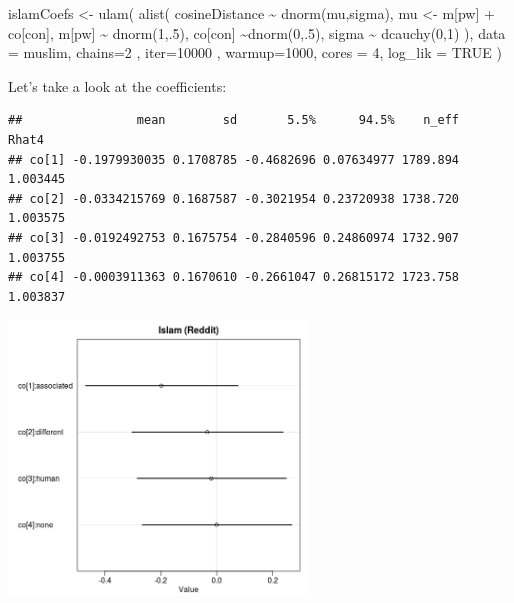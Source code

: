 \documentclass[
  12pt,
]{book}
\newenvironment{Shaded}{\begin{snugshade}}{\end{snugshade}}
\newcommand{\AttributeTok}[1]{\textcolor[rgb]{0.77,0.63,0.00}{#1}}
\newcommand{\ConstantTok}[1]{\textcolor[rgb]{0.00,0.00,0.00}{#1}}
\newcommand{\DecValTok}[1]{\textcolor[rgb]{0.00,0.00,0.81}{#1}}
\newcommand{\FunctionTok}[1]{\textcolor[rgb]{0.00,0.00,0.00}{#1}}
\newcommand{\NormalTok}[1]{#1}
\newcommand{\OtherTok}[1]{\textcolor[rgb]{0.56,0.35,0.01}{#1}}
\newcommand{\SpecialCharTok}[1]{\textcolor[rgb]{0.00,0.00,0.00}{#1}}
\begin{document}
\begin{Shaded}
\begin{Highlighting}[]
\NormalTok{islamCoefs }\OtherTok{\textless{}{-}} \FunctionTok{ulam}\NormalTok{(}
  \FunctionTok{alist}\NormalTok{(}
\NormalTok{    cosineDistance }\SpecialCharTok{\textasciitilde{}} \FunctionTok{dnorm}\NormalTok{(mu,sigma),}
\NormalTok{    mu }\OtherTok{\textless{}{-}}\NormalTok{ m[pw] }\SpecialCharTok{+}\NormalTok{ co[con],}
\NormalTok{    m[pw] }\SpecialCharTok{\textasciitilde{}} \FunctionTok{dnorm}\NormalTok{(}\DecValTok{1}\NormalTok{,.}\DecValTok{5}\NormalTok{),}
\NormalTok{    co[con] }\SpecialCharTok{\textasciitilde{}}\FunctionTok{dnorm}\NormalTok{(}\DecValTok{0}\NormalTok{,.}\DecValTok{5}\NormalTok{),}
\NormalTok{    sigma }\SpecialCharTok{\textasciitilde{}} \FunctionTok{dcauchy}\NormalTok{(}\DecValTok{0}\NormalTok{,}\DecValTok{1}\NormalTok{)}
\NormalTok{  ),}
  \AttributeTok{data =}\NormalTok{ muslim,}
  \AttributeTok{chains=}\DecValTok{2}\NormalTok{ , }\AttributeTok{iter=}\DecValTok{10000}\NormalTok{ , }\AttributeTok{warmup=}\DecValTok{1000}\NormalTok{, }\AttributeTok{cores =} \DecValTok{4}\NormalTok{,}
  \AttributeTok{log\_lik =} \ConstantTok{TRUE}
\NormalTok{)}
\end{Highlighting}
\end{Shaded}

\normalsize

Let's take a look at the coefficients:

\vspace{1mm}
\footnotesize

\begin{verbatim}
##                mean        sd       5.5%      94.5%    n_eff    Rhat4
## co[1] -0.1979930035 0.1708785 -0.4682696 0.07634977 1789.894 1.003445
## co[2] -0.0334215769 0.1687587 -0.3021954 0.23720938 1738.720 1.003575
## co[3] -0.0192492753 0.1675754 -0.2840596 0.24860974 1732.907 1.003755
## co[4] -0.0003911363 0.1670610 -0.2661047 0.26815172 1723.758 1.003837
\end{verbatim}

\normalsize

\begin{center}
\includegraphics[width=8cm]{../images/islamCoeffs.jpeg}
\end{center}
\end{document}
